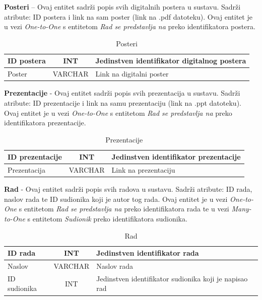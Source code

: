 \textbf{Posteri} – Ovaj entitet sadrži popis svih digitalnih postera u sustavu. Sadrži atribute: ID postera i link na sam poster (link na .pdf datoteku). Ovaj entitet je u vezi \textit{One-to-One} s entitetom \textit{Rad se predstavlja na} preko identifikatora postera.

\begin{table}[H]
	\caption{Posteri}
	\label{tbl:posteri}
	\centering
	\begin{tabular}{|l|c|l|} 
		\hline
		\cellcolor{lightgreen}ID postera & INT & Jedinstven identifikator digitalnog postera\\ 
		\hline
		Poster & VARCHAR & Link na digitalni poster\\ 
		\hline
	\end{tabular}
\end{table}

\textbf{Prezentacije} - Ovaj entitet sadrži popis svih prezentacija u sustavu. Sadrži atribute: ID prezentacije i link na samu prezentaciju (link na .ppt datoteku). Ovaj entitet je u vezi \textit{One-to-One} s entitetom \textit{Rad se predstavlja na} preko identifikatora prezentacije.

\begin{table}[H]
	\caption{Prezentacije}
	\label{tbl:prezentacije}
	\centering
	\begin{tabular}{|l|c|l|} 
		\hline
		\cellcolor{lightgreen}ID prezentacije & INT & Jedinstven identifikator prezentacije\\ 
		\hline
		Prezentacija & VARCHAR & Link na prezentaciju\\ 
		\hline
	\end{tabular}
\end{table}

\textbf{Rad} - Ovaj entitet sadrži popis svih radova u sustavu. Sadrži atribute: ID rada, naslov rada te ID sudionika koji je autor tog rada. Ovaj entitet je u vezi \textit{One-to-One} s entitetom \textit{Rad se predstavlja na} preko identifikatora rada te u vezi \textit{Many-to-One} s entitetom \textit{Sudionik} preko identifikatora sudionika.

\begin{table}[H]
	\caption{Rad}
	\label{tbl:rad}
	\centering
	\begin{tabular}{|l|c|l|} 
		\hline
		\cellcolor{lightgreen}ID rada & INT & Jedinstven identifikator rada\\ 
		\hline
		Naslov & VARCHAR & Naslov rada\\ 
		\hline
		\cellcolor{lightblue}ID sudionika & INT & Jedinstven identifikator sudionika koji je napisao rad\\ 
		\hline
	\end{tabular}
\end{table}

